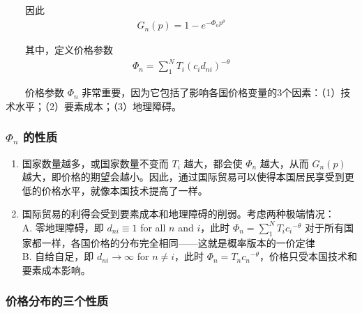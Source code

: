 \documentclass[
]{article}
\providecommand{\tightlist}{%
  \setlength{\itemsep}{0pt}\setlength{\parskip}{0pt}}
\begin{document}
　　因此
\begin{align}
G_{n}(p)=1-e^{-\Phi_{n} p^{\theta}}  \label{eq:6}
\end{align}

　　其中，定义价格参数
\begin{align}
\Phi_{n} = \sum_{1}^{N}T_{i} ( {{c_i}d_{ni}})^{-\theta}  \label{eq:7}
\end{align}

　　价格参数 \(\Phi_n\) 非常重要，因为它包括了影响各国价格变量的3个因素：（1）技术水平；（2）要素成本；（3）地理障碍。

\hypertarget{phi_n-ux7684ux6027ux8d28}{%
\subsubsection{\texorpdfstring{\(\Phi_n\) 的性质}{\textbackslash Phi\_n 的性质}}\label{phi_n-ux7684ux6027ux8d28}}

\begin{enumerate}
\def\labelenumi{\arabic{enumi}.}
\tightlist
\item
  国家数量越多，或国家数量不变而 \(T_i\) 越大，都会使 \(\Phi_n\) 越大，从而 \(G_{n}(p)\) 越大，即价格的期望会越小。因此，通过国际贸易可以使得本国居民享受到更低的价格水平，就像本国技术提高了一样。\\
\item
  国际贸易的利得会受到要素成本和地理障碍的削弱。考虑两种极端情况：\\
  A. 零地理障碍，即 \(d_{n i} \equiv 1\) for all \(n\) and \(i\)，此时 \(\Phi_{n} = \sum_{1}^{N}T_{i}{c_i}^{-\theta}\) 对于所有国家都一样，各国价格的分布完全相同------这就是概率版本的一价定律\\
  B. 自给自足，即 \(d_{n i} \rightarrow \infty\) for \(n \neq i\)，此时 \(\Phi_{n} = T_{n}{c_n}^{-\theta}\)，价格只受本国技术和要素成本影响。
\end{enumerate}

\hypertarget{ux4ef7ux683cux5206ux5e03ux7684ux4e09ux4e2aux6027ux8d28}{%
\subsubsection{价格分布的三个性质}\label{ux4ef7ux683cux5206ux5e03ux7684ux4e09ux4e2aux6027ux8d28}}
\end{document}

